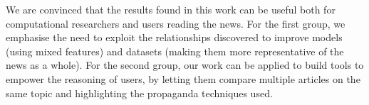 We are convinced that the results found in this work can be useful both for computational researchers and users reading the news.
For the first group, we emphasise the need to exploit the relationships discovered to improve models (using mixed features) and datasets (making them more representative of the news as a whole).
For the second group, our work can be applied to build tools to empower the reasoning of users, by letting them compare multiple articles on the same topic and highlighting the propaganda techniques used.
